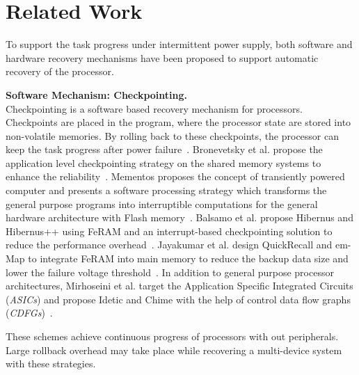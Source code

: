 \section{Related Work} \label{sec:related}
%
To support the task progress under intermittent power supply, both software and hardware recovery mechanisms have been proposed to support automatic recovery of the processor.

\vspace{5pt}
\noindent\textbf{Software Mechanism: Checkpointing.} \\
%
Checkpointing is a software based recovery mechanism for processors.
Checkpoints are placed in the program, where the processor state are stored into non-volatile memories.
By rolling back to these checkpoints, the processor can keep the task progress after power failure~\cite{Dong2011Hybrid, Ma2015Architecture}.
Bronevetsky et al. propose the application level checkpointing strategy on the shared memory systems to enhance the reliability~\cite{Bronevetsky2004Application}.
Mementos proposes the concept of transiently powered computer and presents a software processing strategy which transforms the general purpose programs into interruptible computations for the general hardware architecture with Flash memory~\cite{ransford2012mementos}.
Balsamo et al. propose Hibernus and Hibernus++ using FeRAM and an interrupt-based checkpointing solution to reduce the performance overhead~\cite{balsamo2015hibernus,balsamo2016hibernus++,Rodriguez2015Approaches}.
Jayakumar et al. design QuickRecall and em-Map to integrate FeRAM into main memory to reduce the backup data size and lower the failure voltage threshold~\cite{jayakumar2014quickrecall,jayakumar2015q}.
In addition to general purpose processor architectures, Mirhoseini et al. target the Application Specific Integrated Circuits (\emph{ASICs}) and propose Idetic and Chime with the help of control data flow graphs (\emph{CDFGs})~\cite{Mirhoseini2013Idetic,Mirhoseini2013Automated,Mirhoseini2016Chime}.

These schemes achieve continuous progress of processors with out peripherals.
Large rollback overhead may take place while recovering a multi-device system with these strategies. 

